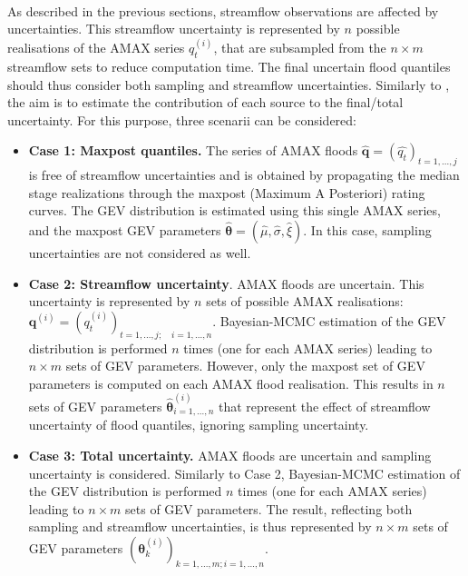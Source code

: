 \documentclass[11pt]{article}
\begin{document}
    \paragraph{}
    As described in the previous sections, streamflow observations are affected by uncertainties. This streamflow uncertainty is represented by $n$ possible realisations of the AMAX series $q_t^{(i)}$, that are subsampled from the $n \times m$ streamflow sets to reduce computation time. The final uncertain flood quantiles should thus consider both sampling and streamflow uncertainties. Similarly to \citet{steinbakk_propagation_2016}, the aim is to estimate the contribution of each source to the final/total uncertainty. For this purpose, three scenarii can be considered:
    
    \begin{itemize}
        \item \textbf{Case 1: Maxpost quantiles.} The series of AMAX floods $\mathbf{\hat{q}} = (\hat{q_t})_{t=1,...,j}$ is free of streamflow uncertainties and is obtained by propagating the median stage realizations through the maxpost (Maximum A Posteriori) rating curves. The GEV distribution is estimated using this single AMAX series, and the maxpost GEV parameters $\boldsymbol{\hat{\theta}} =  (\hat{\mu}, \hat{\sigma}, \hat{\xi})$. In this case, sampling uncertainties are not considered as well.
        
        \item \textbf{Case 2: Streamflow uncertainty}. AMAX floods are uncertain. This uncertainty is represented by $n$ sets of possible AMAX realisations: $\mathbf{q}^{(i)} = (q_t^{(i)})_{t=1,...,j;\quad i=1,...,n}$. Bayesian-MCMC estimation of the GEV distribution is performed $n$ times (one for each AMAX series) leading to $n \times m$ sets of GEV parameters. However, only the maxpost set of GEV parameters is computed on each AMAX flood realisation. This results in $n$ sets of GEV parameters $\boldsymbol{\hat{\theta}}^{(i)}_{i=1,...,n}$ that represent the effect of streamflow uncertainty of flood quantiles, ignoring sampling uncertainty.
    
        \item \textbf{Case 3: Total uncertainty.} AMAX floods are uncertain and sampling uncertainty is considered. Similarly to Case 2, Bayesian-MCMC estimation of the GEV distribution is performed $n$ times (one for each AMAX series) leading to $n \times m$ sets of GEV parameters. The result, reflecting both sampling and streamflow uncertainties, is thus represented by $n \times m$ sets of GEV parameters $(\boldsymbol{\theta}^{(i)}_k)_{k=1,...,m ; i=1,...,n}$.
    \end{itemize}
    
\end{document}
